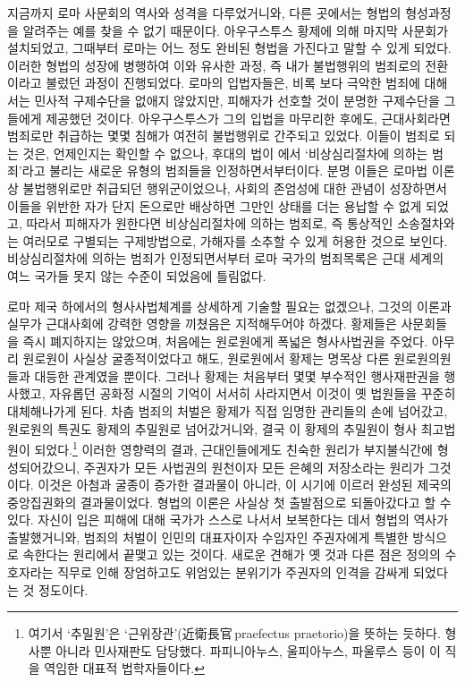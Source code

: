 지금까지 로마 사문회의 역사와 성격을 다루었거니와,
다른 곳에서는 형법의 형성과정을 알려주는 예를 찾을 수 없기 때문이다.
아우구스투스 황제에 의해
마지막 사문회가 설치되었고,
그때부터 로마는 어느 정도 완비된 형법을 가진다고 말할 수 있게 되었다.
이러한 형법의 성장에 병행하여
이와 유사한 과정, 즉
내가 불법행위의 범죄로의 전환이라고 불렀던 과정이 진행되었다.
로마의 입법자들은,
비록 보다 극악한 범죄에 대해서는
민사적 구제수단을 없애지 않았지만,
피해자가 선호할 것이 분명한 구제수단을 그들에게 제공했던 것이다.
아우구스투스가 그의 입법을 마무리한 후에도,
근대사회라면 범죄로만 취급하는
몇몇 침해가 여전히 불법행위로 간주되고 있었다.
이들이 범죄로 되는 것은,
언제인지는 확인할 수 없으나, 후대의
법이 에서
`비상심리절차에 의하는 범죄'라고
불리는 새로운 유형의 범죄들을 인정하면서부터이다.
분명
이들은
로마법 이론상 불법행위로만 취급되던 행위군이었으나,
사회의 존엄성에 대한 관념이 성장하면서
이들을 위반한 자가 단지 돈으로만 배상하면 그만인 상태를
더는 용납할 수 없게 되었고,
따라서 피해자가 원한다면
비상심리절차에 의하는 범죄로,
즉 통상적인 소송절차와는 여러모로 구별되는 구제방법으로,
가해자를 소추할 수 있게 허용한 것으로 보인다.
비상심리절차에 의하는 범죄가 인정되면서부터
로마 국가의 범죄목록은 근대 세계의 여느 국가들 못지 않는 수준이
되었음에 틀림없다.

로마 제국 하에서의 형사사법체계를
상세하게 기술할 필요는 없겠으나,
그것의 이론과 실무가 근대사회에 강력한 영향을 끼쳤음은
지적해두어야 하겠다.
황제들은
사문회들을 즉시 폐지하지는 않았으며,
처음에는
원로원에게
폭넓은 형사사법권을
주었다.
아무리
원로원이
사실상 굴종적이었다고 해도,
원로원에서 황제는
명목상
다른 원로원의원들과 대등한 관계였을 뿐이다.
그러나
황제는
처음부터
몇몇 부수적인 행사재판권을 행사했고,
자유롭던 공화정 시절의 기억이 서서히 사라지면서
이것이 옛 법원들을 꾸준히 대체해나가게 된다.
차츰
범죄의 처벌은
황제가 직접 임명한 관리들의 손에 넘어갔고,
원로원의 특권도 황제의 추밀원로 넘어갔거니와,
결국 이 황제의 추밀원이 형사 최고법원이 되었다.\footnote{%
  여기서 `추밀원'은 `근위장관'(近衛長官\,praefectus praetorio)을
  뜻하는 듯하다. 형사뿐 아니라 민사재판도 담당했다.
  파피니아누스, 울피아누스, 파울루스 등이 이 직을 역임한 대표적 법학자들이다.}
이러한 영향력의 결과,
근대인들에게도 친숙한 원리가 부지불식간에 형성되어갔으니,
주권자가 모든 사법권의 원천이자 모든 은혜의 저장소라는 원리가 그것이다.
이것은 아첨과 굴종이 증가한 결과물이 아니라,
이 시기에 이르러 완성된 제국의 중앙집권화의 결과물이었다.
형법의 이론은 사실상 첫 출발점으로 되돌아갔다고 할 수 있다.
자신이 입은 피해에 대해 국가가 스스로 나서서 보복한다는 데서
형법의 역사가 출발했거니와,
범죄의 처벌이
인민의 대표자이자 수임자인 주권자에게
특별한 방식으로 속한다는 원리에서 끝맺고 있는 것이다.
새로운 견해가 옛 것과 다른 점은
정의의 수호자라는 직무로 인해
장엄하고도 위엄있는 분위기가
주권자의 인격을 감싸게 되었다는 것 정도이다.

